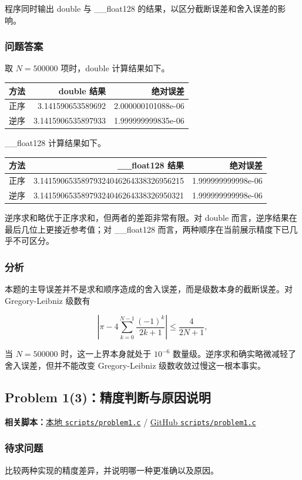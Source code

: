 \documentclass[12pt,a4paper,fontset=none]{ctexart}
\newcommand{\problem}[1]{\subsection{#1}}
\newcommand{\blocktitle}[1]{\subsubsection{#1}}
\newcommand{\codeinline}[1]{{\normalfont #1}}
\newcommand{\fileinline}[1]{{\urlstyle{same}\nolinkurl{#1}}}
\newcommand{\scriptpath}[1]{\fileinline{#1}}
\newcommand{\githubscriptsbase}{https://github.com/Void0312Aurora/computational-physics-homework-2026/blob/main/02/scripts}
\newcommand{\scriptlink}[1]{\noindent\textbf{相关脚本：}\href{../../../scripts/#1}{本地 \scriptpath{scripts/#1}} / \href{\githubscriptsbase/#1}{GitHub \scriptpath{scripts/#1}}\par\medskip}
\begin{document}
程序同时输出 \codeinline{double} 与 \codeinline{\_\_float128} 的结果，以区分截断误差和舍入误差的影响。

\blocktitle{问题答案}

取 \(N=500000\) 项时，\codeinline{double} 计算结果如下。

\begin{table}[H]
  \centering
  \begin{tabular}{lrr}
    \toprule
    方法 & \codeinline{double} 结果 & 绝对误差 \\
    \midrule
    正序 & 3.141590653589692 & 2.000000101088e-06 \\
    逆序 & 3.1415906535897933 & 1.999999999835e-06 \\
    \bottomrule
  \end{tabular}
\end{table}

\codeinline{\_\_float128} 计算结果如下。

\begin{table}[H]
  \centering
  \begin{tabular}{lrr}
    \toprule
    方法 & \codeinline{\_\_float128} 结果 & 绝对误差 \\
    \midrule
    正序 & 3.14159065358979324046264338326956215 & 1.999999999998e-06 \\
    逆序 & 3.14159065358979324046264338326950321 & 1.999999999998e-06 \\
    \bottomrule
  \end{tabular}
\end{table}

逆序求和略优于正序求和，但两者的差距非常有限。对 \codeinline{double} 而言，逆序结果在最后几位上更接近参考值；对 \codeinline{\_\_float128} 而言，两种顺序在当前展示精度下已几乎不可区分。

\blocktitle{分析}

本题的主导误差并不是求和顺序造成的舍入误差，而是级数本身的截断误差。对 Gregory-Leibniz 级数有

\[
\left|\pi-4\sum_{k=0}^{N-1}\frac{(-1)^k}{2k+1}\right|
\le \frac{4}{2N+1},
\]

当 \(N=500000\) 时，这一上界本身就处于 \(10^{-6}\) 数量级。逆序求和确实略微减轻了舍入误差，但并不能改变 Gregory-Leibniz 级数收敛过慢这一根本事实。

\problem{Problem 1(3)：精度判断与原因说明}

\scriptlink{problem1.c}

\blocktitle{待求问题}

比较两种实现的精度差异，并说明哪一种更准确以及原因。
\end{document}
